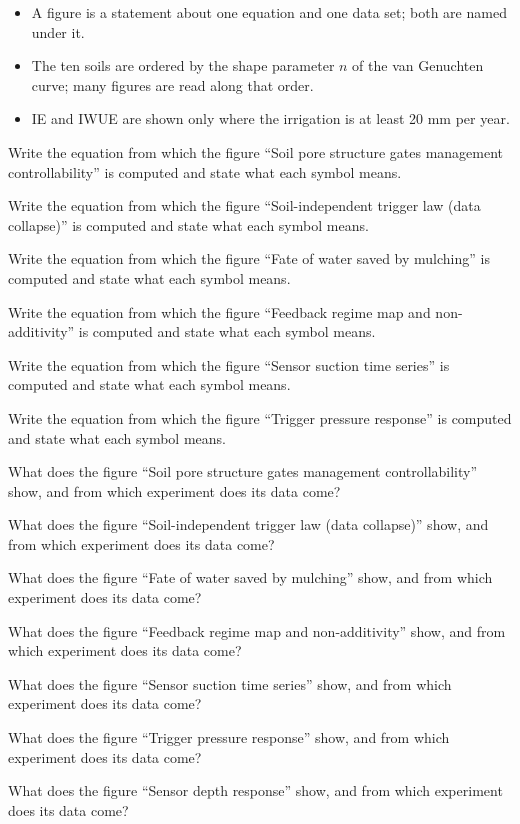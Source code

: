\begin{itemize}
\item A figure is a statement about one equation and one data set; both are named under it.
\item The ten soils are ordered by the shape parameter $n$ of the van Genuchten curve; many figures are read along that order.
\item IE and IWUE are shown only where the irrigation is at least 20 mm per year.
\end{itemize}
\begin{exlist}
\item Write the equation from which the figure ``Soil pore structure gates management controllability'' is computed and state what each symbol means. 
\item Write the equation from which the figure ``Soil-independent trigger law (data collapse)'' is computed and state what each symbol means. 
\item Write the equation from which the figure ``Fate of water saved by mulching'' is computed and state what each symbol means. 
\item Write the equation from which the figure ``Feedback regime map and non-additivity'' is computed and state what each symbol means. 
\item Write the equation from which the figure ``Sensor suction time series'' is computed and state what each symbol means. 
\item Write the equation from which the figure ``Trigger pressure response'' is computed and state what each symbol means. 
\end{exlist}
\begin{exlist}
\item What does the figure ``Soil pore structure gates management controllability'' show, and from which experiment does its data come?
\item What does the figure ``Soil-independent trigger law (data collapse)'' show, and from which experiment does its data come?
\item What does the figure ``Fate of water saved by mulching'' show, and from which experiment does its data come?
\item What does the figure ``Feedback regime map and non-additivity'' show, and from which experiment does its data come?
\item What does the figure ``Sensor suction time series'' show, and from which experiment does its data come?
\item What does the figure ``Trigger pressure response'' show, and from which experiment does its data come?
\item What does the figure ``Sensor depth response'' show, and from which experiment does its data come?
\end{exlist}
